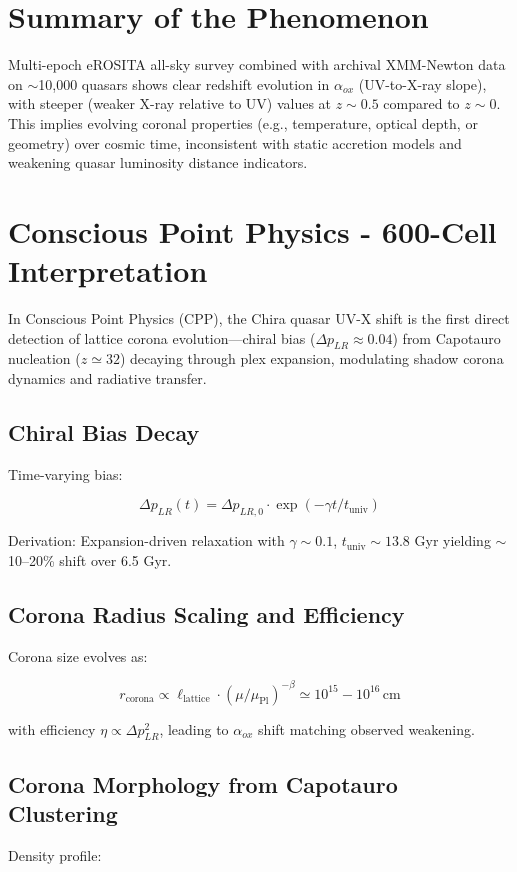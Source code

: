 \documentclass[11pt]{article}
\begin{document}
\section{Summary of the Phenomenon}
Multi-epoch eROSITA all-sky survey combined with archival XMM-Newton data on $\sim$10,000 quasars shows clear redshift evolution in $\alpha_{ox}$ (UV-to-X-ray slope), with steeper (weaker X-ray relative to UV) values at $z \sim 0.5$ compared to $z \sim 0$. This implies evolving coronal properties (e.g., temperature, optical depth, or geometry) over cosmic time, inconsistent with static accretion models and weakening quasar luminosity distance indicators.

\section{Conscious Point Physics - 600-Cell Interpretation}
In Conscious Point Physics (CPP), the Chira quasar UV-X shift is the first direct detection of lattice corona evolution—chiral bias ($\Delta p_{LR} \approx 0.04$) from Capotauro nucleation ($z \simeq 32$) decaying through plex expansion, modulating shadow corona dynamics and radiative transfer.

\subsection{Chiral Bias Decay}
Time-varying bias:

\[
\Delta p_{LR}(t) = \Delta p_{LR,0} \cdot \exp(-\gamma t / t_{\text{univ}})
\]

Derivation: Expansion-driven relaxation with $\gamma \sim 0.1$, $t_{\text{univ}} \sim 13.8$ Gyr yielding $\sim$10--20\% shift over 6.5 Gyr.

\subsection{Corona Radius Scaling and Efficiency}
Corona size evolves as:

\[
r_{\text{corona}} \propto \ell_{\text{lattice}} \cdot (\mu / \mu_{\text{Pl}})^{-\beta} \simeq 10^{15} - 10^{16} \, \text{cm}
\]

with efficiency $\eta \propto \Delta p_{LR}^2$, leading to $\alpha_{ox}$ shift matching observed weakening.

\subsection{Corona Morphology from Capotauro Clustering}
Density profile:
\end{document}
